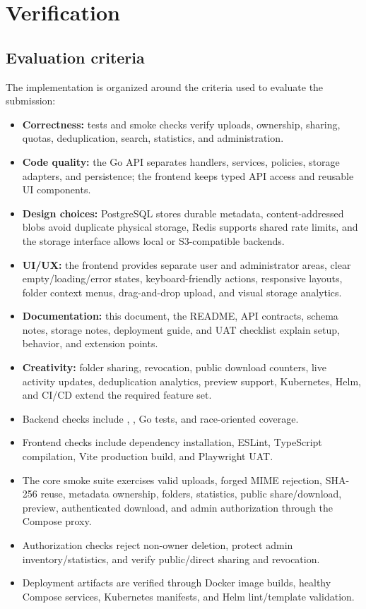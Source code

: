 \documentclass[11pt,a4paper]{article}
\begin{document}
\section{Verification}
\subsection{Evaluation criteria}
The implementation is organized around the criteria used to evaluate the submission:
\begin{itemize}
\item \textbf{Correctness:} tests and smoke checks verify uploads, ownership, sharing, quotas, deduplication, search, statistics, and administration.
\item \textbf{Code quality:} the Go API separates handlers, services, policies, storage adapters, and persistence; the frontend keeps typed API access and reusable UI components.
\item \textbf{Design choices:} PostgreSQL stores durable metadata, content-addressed blobs avoid duplicate physical storage, Redis supports shared rate limits, and the storage interface allows local or S3-compatible backends.
\item \textbf{UI/UX:} the frontend provides separate user and administrator areas, clear empty/loading/error states, keyboard-friendly actions, responsive layouts, folder context menus, drag-and-drop upload, and visual storage analytics.
\item \textbf{Documentation:} this document, the README, API contracts, schema notes, storage notes, deployment guide, and UAT checklist explain setup, behavior, and extension points.
\item \textbf{Creativity:} folder sharing, revocation, public download counters, live activity updates, deduplication analytics, preview support, Kubernetes, Helm, and CI/CD extend the required feature set.
\end{itemize}

\begin{itemize}
\item Backend checks include , , Go tests, and race-oriented coverage.
\item Frontend checks include dependency installation, ESLint, TypeScript compilation, Vite production build, and Playwright UAT.
\item The core smoke suite exercises valid uploads, forged MIME rejection, SHA-256 reuse, metadata ownership, folders, statistics, public share/download, preview, authenticated download, and admin authorization through the Compose proxy.
\item Authorization checks reject non-owner deletion, protect admin inventory/statistics, and verify public/direct sharing and revocation.
\item Deployment artifacts are verified through Docker image builds, healthy Compose services, Kubernetes manifests, and Helm lint/template validation.
\end{itemize}
\end{document}
